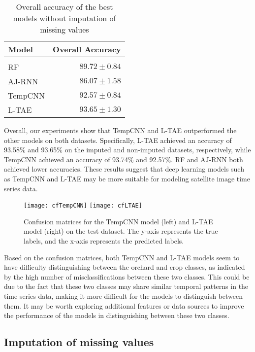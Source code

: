 \begin{table}[H]
  \centering
    \begin{tabular}{lr}
    Model                       & Overall Accuracy             \\[0.2cm] 
    \hline \\[-0.2cm]
    RF      & $89.72 \pm 0.84$\\
    AJ-RNN  & $86.07 \pm 1.58$\\
    TempCNN & $92.57 \pm 0.84$\\
    L-TAE   & $93.65 \pm 1.30$
    \end{tabular}
  \caption{Overall accuracy of the best models without imputation of missing values} 
  \label{tab:ALLresultsNoImputed}
\end{table}

Overall, our experiments show that TempCNN and L-TAE outperformed the other models on both datasets.
Specifically, L-TAE achieved an accuracy of 93.58\% and 93.65\% on the imputed and non-imputed datasets, respectively, 
while TempCNN achieved an accuracy of 93.74\% and 92.57\%. RF and AJ-RNN both achieved lower accuracies. 
These results suggest that deep learning models such as TempCNN and L-TAE may be more suitable for modeling satellite image time series data.

\begin{figure}[H]
  \centering
  \texttt{[image: cfTempCNN]}
  \texttt{[image: cfLTAE]}
  \caption{Confusion matrices for the TempCNN model (left) and L-TAE model (right) on the test dataset. The y-axis represents the true labels, and the x-axis represents the predicted labels.}
\end{figure}

Based on the confusion matrices, both TempCNN and L-TAE models seem to have difficulty distinguishing between the orchard and crop classes, as indicated by the high number of misclassifications between these two classes.
This could be due to the fact that these two classes may share similar temporal patterns in the time series data, making it more difficult for the models to distinguish between them. 
It may be worth exploring additional features or data sources to improve the performance of the models in distinguishing between these two classes.

\subsection{Imputation of missing values}

